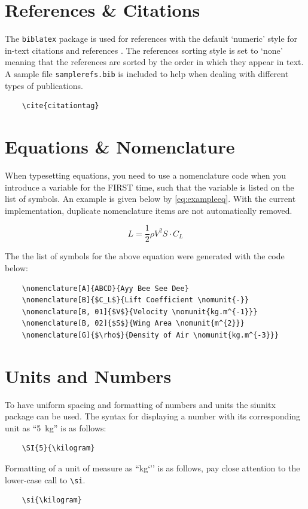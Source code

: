 \section{References \& Citations}
The \texttt{biblatex} package is used for references with the default `numeric'
style for in-text citations and references \cite{sampleref}. The references
sorting style is set to `none' meaning that the references are sorted by the
order in which they appear in text. A sample file \texttt{samplerefs.bib} is
included to help when dealing with different types of publications.

\begin{verbatim}
    \cite{citationtag}
\end{verbatim}


\section{Equations \& Nomenclature}
When typesetting equations, you need to use a nomenclature code when you
introduce a variable for the FIRST time, such that the variable is listed on
the list of symbols. An example is given below by \cref{eq:exampleeq}. With the
current implementation, duplicate nomenclature items are not automatically
removed.

\begin{equation}
\label{eq:exampleeq}
    L = \frac{1}{2}\rho V^2 S \cdot C_{L}
\end{equation}


The the list of symbols for the above equation were generated with the code
below:

\begin{verbatim}
    \nomenclature[A]{ABCD}{Ayy Bee See Dee}
    \nomenclature[B]{$C_L$}{Lift Coefficient \nomunit{-}}
    \nomenclature[B, 01]{$V$}{Velocity \nomunit{kg.m^{-1}}}
    \nomenclature[B, 02]{$S$}{Wing Area \nomunit{m^{2}}}
    \nomenclature[G]{$\rho$}{Density of Air \nomunit{kg.m^{-3}}}
\end{verbatim}


\section{Units and Numbers}
To have uniform spacing and formatting of numbers and units the
\textsf{siunitx} package can be used. The syntax for displaying a number
with its corresponding unit as ``\SI{5}{\kilogram}'' is as follows:

\begin{verbatim}
    \SI{5}{\kilogram}
\end{verbatim}

Formatting of a unit of measure as ``\si{\kilogram}`'' is as follows, pay
close attention to the lower-case call to \texttt{\textbackslash si}.

\begin{verbatim}
    \si{\kilogram}
\end{verbatim}
